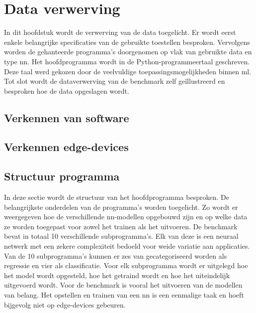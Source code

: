 \chapter{Data verwerving}

In dit hoofdstuk wordt de verwerving van de data toegelicht. Er wordt eerst enkele belangrijke specificaties van de gebruikte toestellen besproken. Vervolgens worden de gehanteerde programma's doorgenomen op vlak van gebruikte data en type \gls{nn}. Het hoofdprogramma wordt in de Python-programmeertaal geschreven. Deze taal werd gekozen door de veelvuldige toepassingsmogelijkheden binnen \gls{ml}. Tot slot wordt de dataverwerving van de benchmark zelf ge\"illustreerd en besproken hoe de data opgeslagen wordt.

\section{Verkennen van software}

\section{Verkennen edge-devices}
	
\section{Structuur programma}
In deze sectie wordt de structuur van het hoofdprogramma besproken. De belangrijkste onderdelen van de programma's worden toegelicht. Zo wordt er weergegeven hoe de verschillende \gls{nn}-modellen opgebouwd zijn en op welke data ze worden toegepast voor zowel het trainen als het uitvoeren. De benchmark bevat in totaal 10 verschillende subprogramma's. Elk van deze is een neuraal netwerk met een zekere complexiteit bedoeld voor weide variatie aan applicaties. Van de 10 subprogramma's kunnen er zes van gecategoriseerd worden als regressie en vier als classificatie. Voor elk subprogramma wordt er uitgelegd hoe het model wordt opgesteld, hoe het getraind wordt en hoe het uiteindelijk uitgevoerd wordt. Voor de benchmark is vooral het uitvoeren van de modellen van belang. Het opstellen en trainen van een \gls{nn} is een eenmalige taak en hoeft bijgevolg niet op edge-devices gebeuren.


